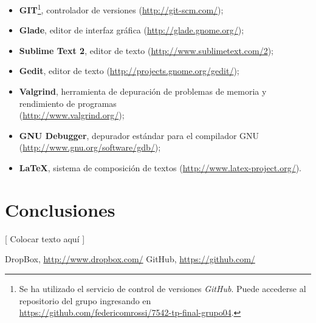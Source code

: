 \documentclass{article}
\begin{document}
	\begin{itemize}
	\itemsep=8pt \topsep=0pt \partopsep=0pt \parskip=0pt \parsep=0pt

		\item \textbf{GIT}\footnote{Se ha utilizado el servicio de control de versiones \textit{GitHub}\cite{GITHUB}. Puede accederse al repositorio del grupo ingresando en\\ \url{https://github.com/federicomrossi/7542-tp-final-grupo04}.}, controlador de versiones (\url{http://git-scm.com/});

		\item \textbf{Glade}, editor de interfaz gráfica (\url{http://glade.gnome.org/});

		\item \textbf{Sublime Text 2}, editor de texto (\url{http://www.sublimetext.com/2});

		\item \textbf{Gedit}, editor de texto (\url{http://projects.gnome.org/gedit/});

		\item \textbf{Valgrind}, herramienta de depuración de problemas de memoria y rendimiento de programas \\(\url{http://www.valgrind.org/});

		\item \textbf{GNU Debugger}, depurador estándar para el compilador GNU (\url{http://www.gnu.org/software/gdb/});

		\item \textbf{LaTeX}, sistema de composición de textos (\url{http://www.latex-project.org/}).

	\end{itemize}	

\bigskip




\section{Conclusiones}

	[ Colocar texto aquí ]
\bigskip



\begin{thebibliography}{99}

	 DropBox, \url{http://www.dropbox.com/}
	 GitHub, \url{https://github.com/}
	
	\end{thebibliography}
\end{document}
